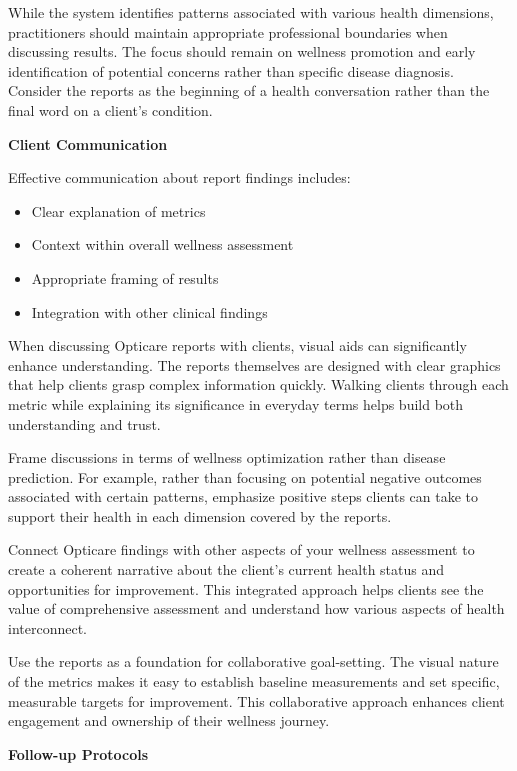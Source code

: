 \documentclass[
  Letterpaper,
]{scrbook}
\providecommand{\tightlist}{%
  \setlength{\itemsep}{0pt}\setlength{\parskip}{0pt}}\usepackage{longtable,booktabs,array}
\begin{document}
While the system identifies patterns associated with various health
dimensions, practitioners should maintain appropriate professional
boundaries when discussing results. The focus should remain on wellness
promotion and early identification of potential concerns rather than
specific disease diagnosis. Consider the reports as the beginning of a
health conversation rather than the final word on a client's condition.

\textbf{Client Communication}

Effective communication about report findings includes:

\begin{itemize}
\tightlist
\item
  Clear explanation of metrics
\item
  Context within overall wellness assessment
\item
  Appropriate framing of results
\item
  Integration with other clinical findings
\end{itemize}

When discussing Opticare reports with clients, visual aids can
significantly enhance understanding. The reports themselves are designed
with clear graphics that help clients grasp complex information quickly.
Walking clients through each metric while explaining its significance in
everyday terms helps build both understanding and trust.

Frame discussions in terms of wellness optimization rather than disease
prediction. For example, rather than focusing on potential negative
outcomes associated with certain patterns, emphasize positive steps
clients can take to support their health in each dimension covered by
the reports.

Connect Opticare findings with other aspects of your wellness assessment
to create a coherent narrative about the client's current health status
and opportunities for improvement. This integrated approach helps
clients see the value of comprehensive assessment and understand how
various aspects of health interconnect.

Use the reports as a foundation for collaborative goal-setting. The
visual nature of the metrics makes it easy to establish baseline
measurements and set specific, measurable targets for improvement. This
collaborative approach enhances client engagement and ownership of their
wellness journey.

\textbf{Follow-up Protocols}
\end{document}
